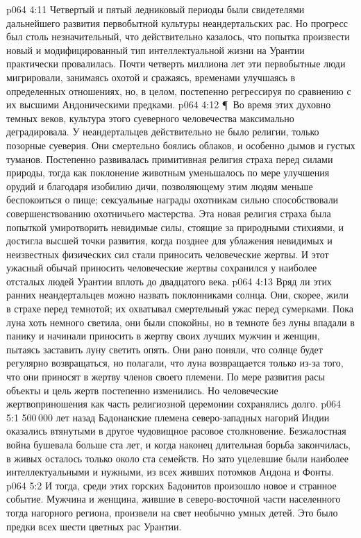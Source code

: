 \vs p064 4:11 Четвертый и пятый ледниковый периоды были свидетелями дальнейшего развития первобытной культуры неандертальских рас. Но прогресс был столь незначительный, что действительно казалось, что попытка произвести новый и модифицированный тип интеллектуальной жизни на Урантии практически провалилась. Почти четверть миллиона лет эти первобытные люди мигрировали, занимаясь охотой и сражаясь, временами улучшаясь в определенных отношениях, но, в целом, постепенно регрессируя по сравнению с их высшими Андоническими предками.
\vs p064 4:12 \P\ Во время этих духовно темных веков, культура этого суеверного человечества максимально деградировала. У неандертальцев действительно не было религии, только позорные суеверия. Они смертельно боялись облаков, и особенно дымов и густых туманов. Постепенно развивалась примитивная религия страха перед силами природы, тогда как поклонение животным уменьшалось по мере улучшения орудий и благодаря изобилию дичи, позволяющему этим людям меньше беспокоиться о пище; сексуальные награды охотникам сильно способствовали совершенствованию охотничьего мастерства. Эта новая религия страха была попыткой умиротворить невидимые силы, стоящие за природными стихиями, и достигла высшей точки развития, когда позднее для ублажения невидимых и неизвестных физических сил стали приносить человеческие жертвы. И этот ужасный обычай приносить человеческие жертвы сохранился у наиболее отсталых людей Урантии вплоть до двадцатого века.
\vs p064 4:13 Вряд ли этих ранних неандертальцев можно назвать поклонниками солнца. Они, скорее, жили в страхе перед темнотой; их охватывал смертельный ужас перед сумерками. Пока луна хоть немного светила, они были спокойны, но в темноте без луны впадали в панику и начинали приносить в жертву своих лучших мужчин и женщин, пытаясь заставить луну светить опять. Они рано поняли, что солнце будет регулярно возвращаться, но полагали, что луна возвращается только из\hyp{}за того, что они приносят в жертву членов своего племени. По мере развития расы объекты и цель жертв постепенно изменились. Но человеческие жертвоприношения как часть религиозной церемонии сохранялись долго.
\vs p064 5:1 500\,000 лет назад Бадонанские племена северо\hyp{}западных нагорий Индии оказались втянутыми в другое чудовищное расовое столкновение. Безжалостная война бушевала больше ста лет, и когда наконец длительная борьба закончилась, в живых осталось только около ста семейств. Но зато уцелевшие были наиболее интеллектуальными и нужными, из всех живших потомков Андона и Фонты.
\vs p064 5:2 И тогда, среди этих горских Бадонитов произошло новое и странное событие. Мужчина и женщина, жившие в северо\hyp{}восточной части населенного тогда нагорного региона,  произвели на свет необычно умных детей. Это было  предки всех шести цветных рас Урантии.
